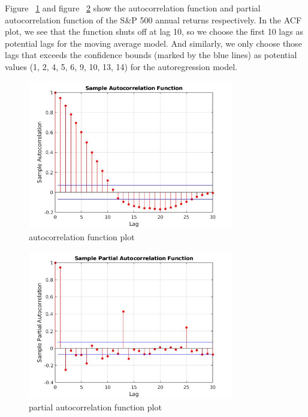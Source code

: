 \documentclass{article}
\begin{document}
Figure ~\ref{fig:acf} and figure ~\ref{fig:pacf} show the autocorrelation function and partial autocorrelation function of the S\&P 500 annual returns respectively. In the ACF plot, we see that the function shuts off at lag 10, so we choose the first 10 lags as potential lags for the moving average model. And similarly, we only choose those lags that exceeds the confidence bounds (marked by the blue lines) as potential values (1, 2, 4, 5, 6, 9, 10, 13, 14) for the autoregression model.

\begin{figure}[h!]
    \centering
        \includegraphics[width=0.8\textwidth]{acf.jpg}
    \caption{autocorrelation function plot}
    \label{fig:acf}
\end{figure}

\begin{figure}[h!]
    \centering
        \includegraphics[width=0.8\textwidth]{pacf.jpg}
    \caption{partial autocorrelation function plot}
    \label{fig:pacf}
\end{figure}
\end{document}
